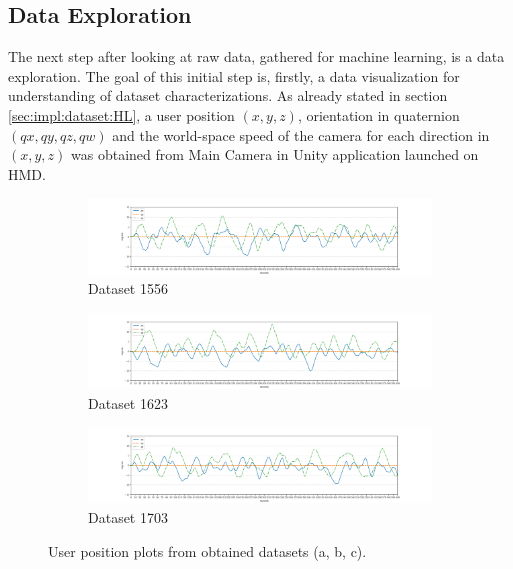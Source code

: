 \subsection{Data Exploration}
\label{sec:impl:dataset:explor} 
The next step after looking at raw data, gathered for machine learning, is a data exploration. The goal of this initial step is, firstly, a data visualization for understanding of dataset characterizations. As already stated in section \ref{sec:impl:dataset:HL}, a user position $(x, y, z)$, orientation in quaternion $(qx, qy, qz, qw)$ and the world-space speed of the camera for each direction in $(x, y, z)$ was obtained from Main Camera in Unity application launched on HMD.\\
\begin{figure}[H]
	\centering
	\begin{subfigure}[b]{1\textwidth}
		\centering
		\includegraphics[width=1\textwidth, keepaspectratio]{gfx/Fig-1556-position.pdf}
		\caption{Dataset 1556}
		\label{fig:pos1}
	\end{subfigure}
	\qquad
	\begin{subfigure}[b]{1\textwidth}
		\centering
		\includegraphics[width=\textwidth]{gfx/Fig-1613-position.pdf}
		\caption{Dataset 1623}
		\label{fig:pos2}
	\end{subfigure}
	\qquad
	\begin{subfigure}[b]{1\textwidth}
		\centering
		\includegraphics[width=1\textwidth, keepaspectratio]{gfx/Fig-1703-position.pdf}
		\caption{Dataset 1703}
		\label{fig:pos3}
	\end{subfigure}
	\caption{User position plots from obtained datasets (a, b, c).}
	\label{fig:datasets}
\end{figure}
